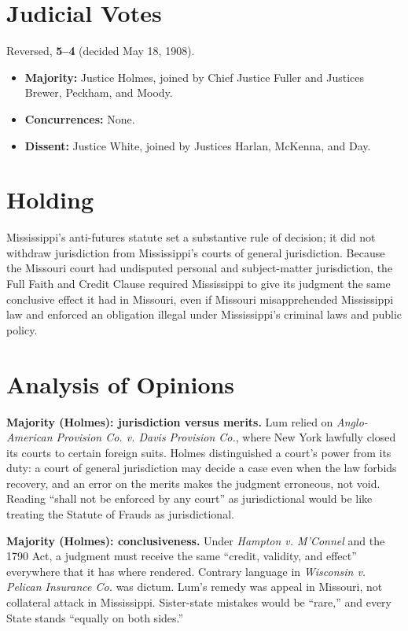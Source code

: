 \documentclass[12pt]{article}
\begin{document}
\section{Judicial Votes}

Reversed, \textbf{5--4} (decided May 18, 1908).
\begin{itemize}
\item \textbf{Majority:} Justice Holmes, joined by Chief Justice Fuller and Justices Brewer, Peckham, and Moody.
\item \textbf{Concurrences:} None.
\item \textbf{Dissent:} Justice White, joined by Justices Harlan, McKenna, and Day.
\end{itemize}

\section{Holding}

Mississippi's anti-futures statute set a substantive rule of decision; it did not withdraw jurisdiction from Mississippi's courts of general jurisdiction. Because the Missouri court had undisputed personal and subject-matter jurisdiction, the Full Faith and Credit Clause required Mississippi to give its judgment the same conclusive effect it had in Missouri, even if Missouri misapprehended Mississippi law and enforced an obligation illegal under Mississippi's criminal laws and public policy.

\section{Analysis of Opinions}

\textbf{Majority (Holmes): jurisdiction versus merits.} Lum relied on \textit{Anglo-American Provision Co. v. Davis Provision Co.}, where New York lawfully closed its courts to certain foreign suits. Holmes distinguished a court's power from its duty: a court of general jurisdiction may decide a case even when the law forbids recovery, and an error on the merits makes the judgment erroneous, not void. Reading ``shall not be enforced by any court'' as jurisdictional would be like treating the Statute of Frauds as jurisdictional.

\textbf{Majority (Holmes): conclusiveness.} Under \textit{Hampton v. M'Connel} and the 1790 Act, a judgment must receive the same ``credit, validity, and effect'' everywhere that it has where rendered. Contrary language in \textit{Wisconsin v. Pelican Insurance Co.} was dictum. Lum's remedy was appeal in Missouri, not collateral attack in Mississippi. Sister-state mistakes would be ``rare,'' and every State stands ``equally on both sides.''
\end{document}
